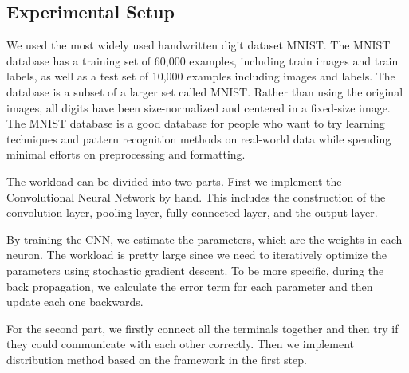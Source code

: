 \subsection{Experimental Setup}
We used the most widely used handwritten digit dataset MNIST. The MNIST database has a training set of 60,000 examples, including train images and train labels, as well as a test set of 10,000 examples including images and labels. The database is a subset of a larger set called MNIST. Rather than using the original images, all digits have been size-normalized and centered in a fixed-size image. The MNIST database is a good database for people who want to try learning techniques and pattern recognition methods on real-world data while spending minimal efforts on preprocessing and formatting.



The workload can be divided into two parts. First we implement the Convolutional Neural Network by hand. This includes the construction of the convolution layer, pooling layer, fully-connected layer, and the output layer.


By training the CNN, we estimate the parameters, which are the weights in each neuron. The workload is pretty large since we need to iteratively optimize the parameters using stochastic gradient descent. To be more specific, during the back propagation, we calculate the error term for each parameter and then update each one backwards. 

For the second part, we firstly connect all the terminals together and then try if they could communicate with each other correctly. Then we implement distribution method based on the framework in the first step.  

